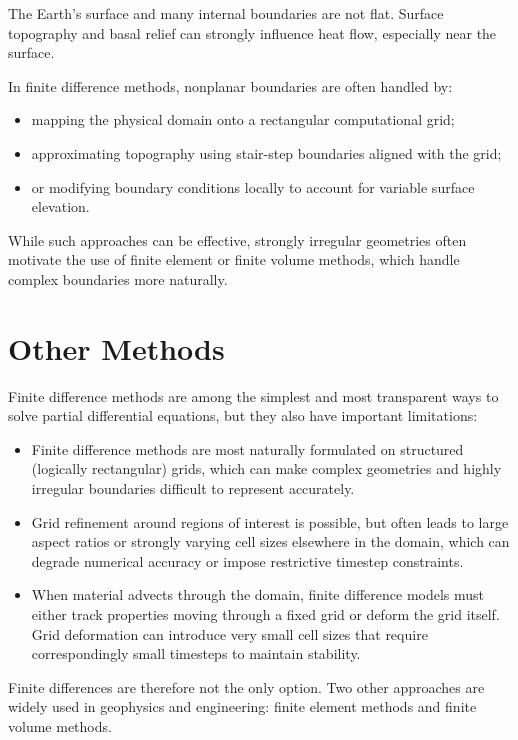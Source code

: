 The Earth's surface and many internal boundaries are not flat. Surface topography and basal relief can strongly influence heat flow, especially near the surface.

In finite difference methods, nonplanar boundaries are often handled by:
\begin{itemize}
  \item mapping the physical domain onto a rectangular computational grid;
  \item approximating topography using stair-step boundaries aligned with the grid;
  \item or modifying boundary conditions locally to account for variable surface elevation.
\end{itemize}

While such approaches can be effective, strongly irregular geometries often motivate the use of finite element or finite volume methods, which handle complex boundaries more naturally.

\section{Other Methods}

Finite difference methods are among the simplest and most transparent ways to solve partial differential equations, but they also have important limitations:
\begin{itemize}
    \item Finite difference methods are most naturally formulated on structured (logically rectangular) grids, which can make complex geometries and highly irregular boundaries difficult to represent accurately.
    \item Grid refinement around regions of interest is possible, but often leads to large aspect ratios or strongly varying cell sizes elsewhere in the domain, which can degrade numerical accuracy or impose restrictive timestep constraints.
    \item When material advects through the domain, finite difference models must either track properties moving through a fixed grid or deform the grid itself. Grid deformation can introduce very small cell sizes that require correspondingly small timesteps to maintain stability.
\end{itemize}

Finite differences are therefore not the only option. Two other approaches are widely used in geophysics and engineering: finite element methods and finite volume methods.

